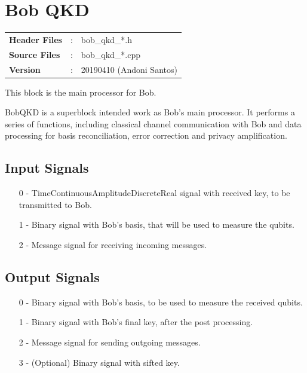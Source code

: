 \clearpage
\graphicspath{{./lib/bob_qkd2/figures/}}
\section{Bob QKD}

\begin{tcolorbox}	
	\begin{tabular}{p{2.75cm} p{0.2cm} p{10.5cm}} 	
        \textbf{Header Files}    &:& bob\_qkd\_*.h \\
		\textbf{Source Files}    &:& bob\_qkd\_*.cpp \\
        \textbf{Version}         &:& 20190410 (Andoni Santos)
	\end{tabular}
\end{tcolorbox}

\maketitle
This block is the main processor for Bob. 

BobQKD is a superblock intended work as Bob's main processor. It performs a 
series of functions, including classical channel communication with Bob and 
data processing for basis reconciliation, error correction and privacy 
amplification.

\subsection*{Input Signals}

\begin{itemize}
	\item[0] - TimeContinuousAmplitudeDiscreteReal signal with received key, to be transmitted to Bob.
	\item[1] - Binary signal with Bob's basis, that will be used to measure the qubits.
	\item[2] - Message signal for receiving incoming messages. 
\end{itemize}

\subsection*{Output Signals}

\begin{itemize}
	\item[0] - Binary signal with Bob's basis, to be used to measure the
	received qubits.
	\item[1] - Binary signal with Bob's final key, after the post processing.
	\item[2] - Message signal for sending outgoing messages.
	\item[3] - (Optional) Binary signal with sifted key.
\end{itemize}

